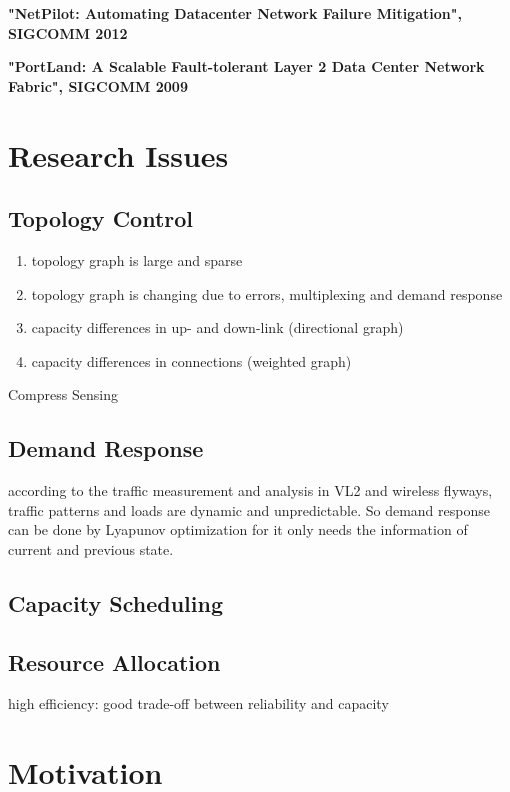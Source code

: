 \documentclass[journal,onecolumn,11pt]{IEEEtran}
\begin{document}
\textbf{"NetPilot: Automating Datacenter Network Failure Mitigation", SIGCOMM 2012}

\textbf{"PortLand: A Scalable Fault-tolerant Layer 2 Data Center Network Fabric", SIGCOMM 2009}

\section{Research Issues}

\subsection{Topology Control}

\begin{enumerate}
  \item topology graph is large and sparse
  \item topology graph is changing due to errors, multiplexing and demand response
  \item capacity differences in up- and down-link (directional graph)
  \item capacity differences in connections (weighted graph)
\end{enumerate}

Compress Sensing

\subsection{Demand Response}

according to the traffic measurement and analysis in VL2 and wireless flyways, traffic patterns and loads are dynamic and unpredictable. So demand response can be done by Lyapunov optimization for it only needs the information of current and previous state.

\subsection{Capacity Scheduling}

\subsection{Resource Allocation}

high efficiency: good trade-off between reliability and capacity

\section{Motivation}
\end{document}
